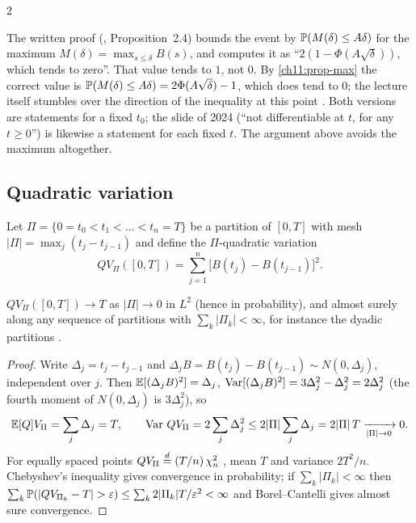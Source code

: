 \begin{paracol}{2}
\begin{coursenote}
The written proof (, Proposition~2.4) bounds the event by $\mathbb{P}(M(\delta)\le A\delta)$ for the maximum
$M(\delta)=\max_{s\le\delta}B(s)$, and computes it as ``$2(1-\Phi(A\sqrt\delta))$, which tends to zero''. That value tends to $1$, not
$0$. By \cref{ch11:prop-max} the correct value is $\mathbb{P}(M(\delta)\le A\delta)=2\Phi(A\sqrt\delta)-1$, which does tend to $0$; the
lecture itself stumbles over the direction of the inequality at this point . Both versions are statements for a fixed $t_0$; the slide of 2024 (``not differentiable at $t$, for any $t\ge0$'') is likewise a statement for each fixed $t$.
The argument above avoids the maximum altogether.
\end{coursenote}

\subsection{Quadratic variation}
Let $\Pi=\{0=t_0<t_1<\dots<t_n=T\}$ be a partition of $[0,T]$ with mesh $|\Pi|=\max_j(t_j-t_{j-1})$ and define the
$\Pi$-quadratic variation
\[
  QV_\Pi([0,T])=\sum_{j=1}^{n}\bigl[B(t_j)-B(t_{j-1})\bigr]^2 .
\]

\begin{theorem}\label{ch11:thm-qv}
$QV_\Pi([0,T])\to T$ as $|\Pi|\to0$ in $L^2$ (hence in probability), and almost surely along any sequence of partitions with
$\sum_k|\Pi_k|<\infty$, for instance the dyadic partitions .
\end{theorem}
\begin{proof}
Write $\Delta_j=t_j-t_{j-1}$ and $\Delta_jB=B(t_j)-B(t_{j-1})\sim N(0,\Delta_j)$, independent over $j$. Then
$\mathbb{E}[(\Delta_jB)^2]=\Delta_j$, $\operatorname{Var}[(\Delta_jB)^2]=3\Delta_j^2-\Delta_j^2=2\Delta_j^2$ (the fourth moment of $N(0,\Delta_j)$ is $3\Delta_j^2$), so
\[
  \mathbb{E}[Q]V_\Pi=\sum_j\Delta_j=T,\qquad
  \operatorname{Var}\,QV_\Pi=2\sum_j\Delta_j^2\le2|\Pi|\sum_j\Delta_j=2|\Pi|\,T\xrightarrow[|\Pi|\to0]{}0 .
\]
For equally spaced points $QV_\Pi\stackrel{d}{=}(T/n)\,\chi^2_n$ , mean $T$ and variance $2T^2/n$. Chebyshev's inequality gives
convergence in probability; if $\sum_k|\Pi_k|<\infty$ then $\sum_k\Prob(|QV_{\Pi_k}-T|>\varepsilon)\le\sum_k2|\Pi_k|T/\varepsilon^2<\infty$ and
Borel--Cantelli gives almost sure convergence.
\end{proof}


\end{paracol}
